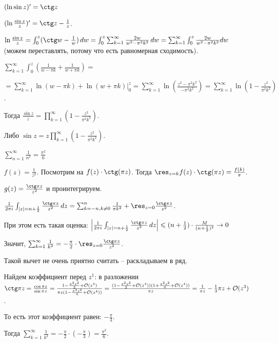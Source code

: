 \begin{example}
    $(\ln \sin z)' = \ctg z$

    $(\ln \frac{\sin z}{z})' = \ctg z - \frac{1}{z}$.

    $\ln \frac{\sin z}{z} = \int_{0}^{z} (\ctg w - \frac{1}{w}) \, dw = \int_{0}^{z} \sum_{k=1}^{\infty} \frac{2w}{w^2 - \pi^2 k^2} \, dw = 
    \sum_{k = 1}^{\infty} \int_{0}^{z} {\frac{2w}{w^2 - \pi^2 k^2} dw}$ (можем переставлять, потому что есть равномерная сходимость).
    
    $\sum_{k = 1}^{\infty} \int_{0}^{z} \left ( \frac{1}{w - \pi k} + \frac{1}{w + \pi k} \right ) =$

    $= \sum_{k = 1}^{\infty} \ln (w - \pi k) + \ln (w + \pi k) \bigg |_{0}^z = \sum_{k = 1}^{\infty} \ln 
    \left ( \frac{z^2 - \pi^2 k^2}{-\pi^2 k^2} \right ) = \sum_{k = 1}^{\infty} \ln \left ( 1 - \frac{z^2}{\pi^2 k^2} \right )$.

    Тогда $\frac{\sin z}{z} = \prod_{k = 1}^{\infty} \left(1 - \frac{z^2}{\pi^2 k^2} \right)$.
    
    Либо $\sin z = z \prod_{k = 1}^{\infty} \left(1 - \frac{z^2}{\pi^2 k^2} \right)$.
\end{example}

\begin{example}
    $\sum_{n = 1}^{\infty} \frac{1}{n^2} = \frac{\pi^2}{6}$

    $f(z) = \frac{1}{z^2}$. Посмотрим на $f(z) \cdot \ctg (\pi z)$. Тогда
    $\res_{z = k} f(z) \cdot \ctg (\pi z) = \frac{f(k)}{\pi}$.

    $g(z) = \frac{\ctg \pi z}{z^2}$ и проинтегрируем.

    $\frac{1}{2 \pi i} \int_{|z| = n + \frac{1}{2}} \frac{\ctg \pi z}{z^2} \, dz = 
    \sum_{k = -n, k \neq 0}^n \frac{1}{\pi k^2} + \res_{z = 0} \frac{\ctg \pi z}{z^2}$.

    При этом есть такая оценка:
    $\left | \frac{1}{2 \pi i} \int_{|z| = n + \frac{1}{2}} \frac{\ctg \pi z}{z^2} \, dz \right | \leqslant 
    (n + \frac{1}{2}) \cdot \frac{M}{(n + \frac{1}{2})^2} \rightarrow 0$

    Значит, $\sum_{k = 1}^{\infty} \frac{1}{k^2} = -\frac{\pi}{2} \cdot \res_{z = 0} \frac{\ctg \pi z}{z^2}$.
    
    Такой вычет не очень приятно считать -- раскладываем в ряд.

    Найдем коэффициент перед $z^1$: в разложении $\ctg \pi z = \frac{\cos \pi z}{\sin \pi z} = \frac{1 - \frac{\pi^2 z^2}{2} + \mathcal{O}(z^4)}{\pi z (1 - \frac{\pi^2 z^2}{6} + \mathcal{O}(z^4))} = 
    \frac{(1 - \frac{\pi^2 z^2}{2} + \mathcal{O}(z^4))(1 + \frac{\pi^2 z^2}{6} + \mathcal{O}(z^4))}{\pi z} = \frac{1}{\pi z} - \frac{1}{3} \pi z + \mathcal{O}(z^3)$.

    То есть этот коэффициент равен: $-\frac{\pi}{3}$.

    Тогда $\sum_{k = 1}^{\infty} \frac{1}{k^2} = -\frac{\pi}{2} \cdot (-\frac{\pi}{3}) = \frac{\pi^2}{6}$.
\end{example}


